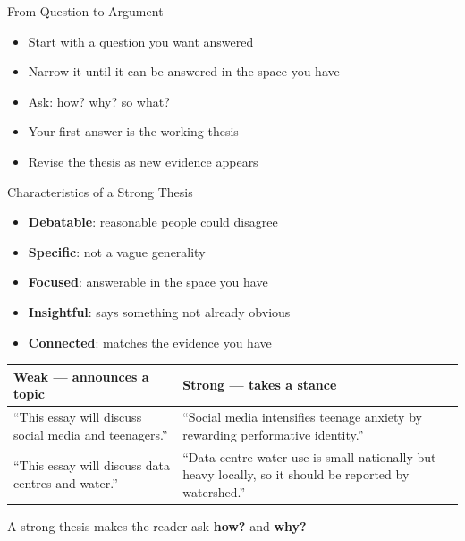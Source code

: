 \documentclass[aspectratio=169]{beamer}
\begin{document}
\begin{frame}{From Question to Argument}
\begin{itemize}
  \item Start with a question you want answered
  \item Narrow it until it can be answered in the space you have
  \item Ask: how? why? so what?
  \item Your first answer is the working thesis
  \item Revise the thesis as new evidence appears
\end{itemize}
\end{frame}

\begin{frame}{Characteristics of a Strong Thesis}
\begin{itemize}
  \item \textbf{Debatable}: reasonable people could disagree
  \item \textbf{Specific}: not a vague generality
  \item \textbf{Focused}: answerable in the space you have
  \item \textbf{Insightful}: says something not already obvious
  \item \textbf{Connected}: matches the evidence you have
\end{itemize}
\vspace{1ex}
\small
\begin{tabular}{@{}p{}p{}@{}}
\toprule
\textbf{Weak} --- announces a topic & \textbf{Strong} --- takes a stance \\
\midrule
``This essay will discuss social media and teenagers.'' &
``Social media intensifies teenage anxiety by rewarding performative
identity.'' \\
\addlinespace
``This essay will discuss data centres and water.'' &
``Data centre water use is small nationally but heavy locally, so it should
be reported by watershed.'' \\
\bottomrule
\end{tabular}
\vspace{1ex}

A strong thesis makes the reader ask \textbf{how?} and \textbf{why?}
\end{frame}
\end{document}
